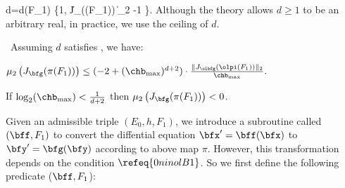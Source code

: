	d=d(F_1) \as\max\Big\{1,
			 \| J_{\olbfg}(\olpi(F_1)) \|_2 -1 \Big\}.
	\eeql
	Although the theory allows $d\ge 1$ to be an arbitrary real,
	in practice, we use the ceiling of $d$.
	
	\bleml[Set-d]\
		Assuming $d$ satisfies , we have:
	\benum[(a)]
	\item
		$\mu_2 \left(J_{\bfg} (\pi(F_1))\right)
				\le	 (-2+(\chb_{\max})^{d+2})
				\cdot \frac{\|J_{\olbfg}(\olpi(F_1))\|_2}{\chb_{\max}}.$
	\item
		If
			$\log_2(\chb_{\max}) < \tfrac{1}{d+2}$
		then
			$\mu_2 \left(J_{\bfg} (\pi(F_1))\right)< 0$.
	\eenum
	\eleml
	

	Given an admissible triple $(E_0,h,F_1)$,
	we introduce a subroutine called \Transform$(\bff,F_1)$ to
	convert the diffential equation
	$\bfx'=\bff(\bfx)$ to $\bfy'=\bfg(\bfy)$ according to above map
	$\pi$.   However, this transformation depends on the
	condition $\refeq{0ninolB1}$.  So we first define the
	following predicate \AvoidsZero($\bff,F_1$):

	\Ldent{}

